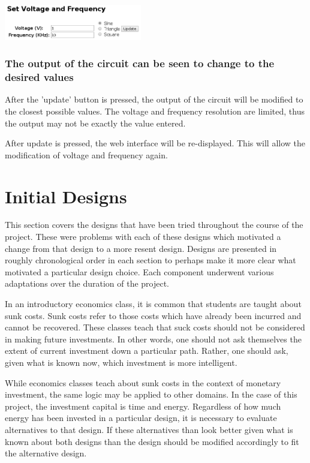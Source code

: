 \documentclass{article}	%
\begin{document}
\begin{multicols}{2}
\begin{center}
\includegraphics[width=0.45\textwidth,keepaspectratio]{web_interface_updating_values.png}
\end{center}

\subsubsection{The output of the circuit can be seen to change to the desired values}
After the 'update' button is pressed,
the output of the circuit will be modified
to the closest possible values.
The voltage and frequency resolution are limited,
thus the output may not be exactly the value entered.

After update is pressed,
the web interface will be re-displayed.
This will allow the modification of voltage and frequency again.

\newpage
\section{Initial Designs}
This section covers the designs that have been tried
throughout the course of the project. 
These were problems with each of these designs
which motivated a change from that design to
a more resent design.
Designs are presented in roughly chronological order in each section
to perhaps make it more clear what motivated
a particular design choice.
Each component underwent various adaptations 
over the duration of the project.

In an introductory economics class,
it is common that students are taught about sunk costs.
Sunk costs refer to those costs which
have already been incurred and
cannot be recovered.
These classes teach that suck costs should not
be considered in making future investments.
In other words,
one should not ask themselves the extent of 
current investment down a particular path.
Rather, one should ask,
given what is known now,
which investment is more intelligent.

While economics classes teach about sunk costs in
the context of monetary investment,
the same logic may be applied to other domains.
In the case of this project,
the investment capital is time and energy.
Regardless of how much energy has been invested
in a particular design,
it is necessary to evaluate alternatives to that design.
If these alternatives than look better
given what is known about both designs
than the design should be modified accordingly
to fit the alternative design.


\end{multicols}
\end{document}
